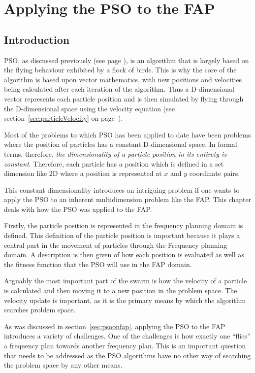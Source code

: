 \chapter{Applying the PSO to the FAP}
\label{chpt:psoapplicationFAP}
\section{Introduction}
PSO, as discussed previously (see page \pageref{sec:PSO}), is an algorithm that is largely based on the flying behaviour exhibited by a flock of birds. This is why the core of the algorithm is based upon vector mathematics, with new positions and velocities being calculated after each iteration of the algorithm. Thus a D-dimensional vector represents each particle position and is then simulated by flying through the D-dimensional space using the velocity equation (see section~\ref{sec:particleVelocity} on page~\pageref{eq:velocityupdate}).

Most of the problems to which PSO has been applied to date have been problems where the position of particles has a constant D-dimensional space. In formal terms, therefore, \emph{the dimensionality of a particle position in its entirety is constant}. Therefore, each particle has a position which is defined in a set dimension like 2D where a position is represented at $x$ and $y$ coordinate pairs.

This constant dimensionality introduces an intriguing problem if one wants to apply the PSO to an inherent multidimension problem like the FAP. This chapter deals with how the PSO was applied to the FAP.

Firstly, the particle position is represented in the frequency planning domain is defined. This definition of the particle position is important because it plays a central part in
the movement of particles through the Frequency planning domain. A description is then given of how each position is evaluated as well as the fitness function that the PSO will use in the FAP domain.

Arguably the most important part of the swarm is how the velocity of a particle is calculated and then moving it to a new position in the problem space. The velocity update is important, as it is the primary means by which the algorithm searches problem space.

As was discussed in section~\ref{sec:psoonfap}, applying the PSO to the FAP introduces a variety of challenges. One of the challenges is how exactly one ``flies'' a frequency plan towards another frequency plan. This is an important question that needs to be addressed as the PSO algorithms have no other way of searching the problem space by any other means.

